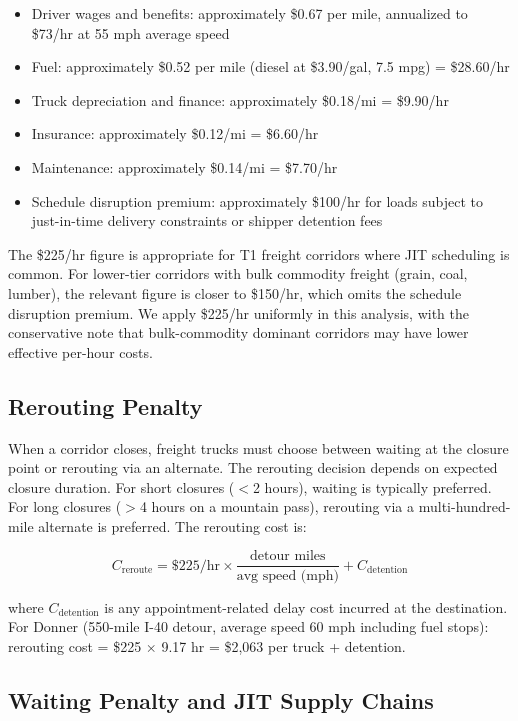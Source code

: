 \begin{itemize}
\item Driver wages and benefits: approximately \$0.67 per mile, annualized to \$73/hr at
55 mph average speed
\item Fuel: approximately \$0.52 per mile (diesel at \$3.90/gal, 7.5 mpg) = \$28.60/hr
\item Truck depreciation and finance: approximately \$0.18/mi = \$9.90/hr
\item Insurance: approximately \$0.12/mi = \$6.60/hr
\item Maintenance: approximately \$0.14/mi = \$7.70/hr
\item Schedule disruption premium: approximately \$100/hr for loads subject to just-in-time
delivery constraints or shipper detention fees
\end{itemize}

The \$225/hr figure is appropriate for T1 freight corridors where JIT scheduling is common.
For lower-tier corridors with bulk commodity freight (grain, coal, lumber), the relevant
figure is closer to \$150/hr, which omits the schedule disruption premium. We apply
\$225/hr uniformly in this analysis, with the conservative note that bulk-commodity
dominant corridors may have lower effective per-hour costs.

\subsection{Rerouting Penalty}

When a corridor closes, freight trucks must choose between waiting at the closure point
or rerouting via an alternate. The rerouting decision depends on expected closure duration.
For short closures ($<$2 hours), waiting is typically preferred. For long closures ($>$4
hours on a mountain pass), rerouting via a multi-hundred-mile alternate is preferred.
The rerouting cost is:

\begin{equation}
C_\text{reroute} = \$225/\text{hr} \times \frac{\text{detour miles}}{\text{avg speed
(mph)}} + C_\text{detention}
\end{equation}

where $C_\text{detention}$ is any appointment-related delay cost incurred at the
destination. For Donner (550-mile I-40 detour, average speed 60 mph including fuel
stops): rerouting cost = \$225 $\times$ 9.17 hr = \$2,063 per truck + detention.

\subsection{Waiting Penalty and JIT Supply Chains}

